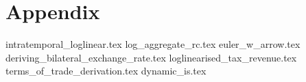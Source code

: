 \section{Appendix}
\appendix 
\renewcommand{\theequation}{A.\arabic{equation}}
{intratemporal_loglinear.tex}
{log_aggregate_rc.tex}
{euler_w_arrow.tex}
{deriving_bilateral_exchange_rate.tex}
{loglinearised_tax_revenue.tex}
{terms_of_trade_derivation.tex}
{dynamic_is.tex}

